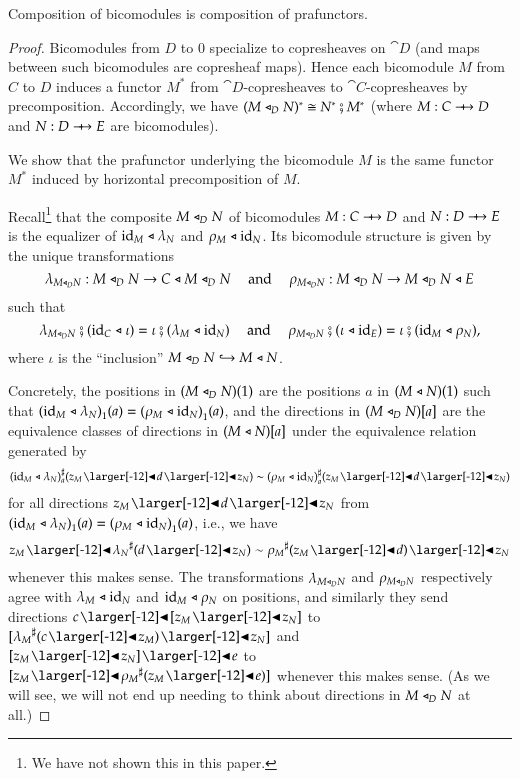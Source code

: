 \documentclass{amsart}
\begin{document}
\begin{prop}
  Composition of bicomodules is composition of prafunctors.
\end{prop}
\begin{proof}
  Bicomodules from $D$ to $0$ specialize to copresheaves on $\cat{D}$
  (and maps between such bicomodules are copresheaf maps). Hence each
  bicomodule $M$ from $C$ to $D$ induces a functor $M^*$ from
  $\cat{D}$-copresheaves to $\cat{C}$-copresheaves by
  precomposition. Accordingly, we have
  $(M \mathrel{\triangleleft}_D N)^* \cong N^* \fatsemi M^*$ (where $M: C \bim D$ and
  $N: D \bim E$ are bicomodules).
  
  We show that the prafunctor underlying the bicomodule $M$ is the
  same functor $M^*$ induced by horizontal precomposition of $M$.

  Recall\footnote{We have not shown this in this paper.} that the
  composite $M \mathrel{\triangleleft}_D N$ of bicomodules ${M: C \bim D}$ and
  ${N: D \bim E}$ is the equalizer of $\mathrm{id}_M \mathrel{\triangleleft} \lambda_N$ and
  $\rho_M \mathrel{\triangleleft} \mathrm{id}_N$. Its bicomodule structure is given by the
  unique transformations
  \[\lambda_{M \mathrel{\triangleleft}_D N}: M \mathrel{\triangleleft}_D N \to C \mathrel{\triangleleft} M \mathrel{\triangleleft}_D N \quad
    \text{ and } \quad \rho_{M \mathrel{\triangleleft}_D N} : M \mathrel{\triangleleft}_D N \to M \mathrel{\triangleleft}_D N
    \mathrel{\triangleleft} E\] such that
  \[\lambda_{M \mathrel{\triangleleft}_D N} \fatsemi (\mathrm{id}_C \mathrel{\triangleleft} \iota) = \iota \fatsemi
  (\lambda_M \mathrel{\triangleleft} \mathrm{id}_N) \quad \text{ and } \quad
  \rho_{M \mathrel{\triangleleft}_D N} \fatsemi (\iota \mathrel{\triangleleft} \mathrm{id}_E) = \iota \fatsemi
  (\mathrm{id}_M \mathrel{\triangleleft} \rho_N),\] where $\iota$ is the ``inclusion''
  $M \mathrel{\triangleleft}_D N \hookrightarrow M \mathrel{\triangleleft} N$.

  Concretely, the positions in $(M \mathrel{\triangleleft}_D N)(1)$ are the positions
  $a$ in $(M \mathrel{\triangleleft} N)(1)$ such that
  ${(\mathrm{id}_M \mathrel{\triangleleft} \lambda_N)}_1(a) = {(\rho_M \mathrel{\triangleleft}
    \mathrm{id}_N)}_1(a)$, and the directions in $(M \mathrel{\triangleleft}_D N)[a]$ are the
  equivalence classes of directions in $(M \mathrel{\triangleleft} N)[a]$ under the
  equivalence relation generated by
  \[\dirmapof{(\id_M \sub \lambda_N)}{a}{z_M \subd d \subd z_N} \sim \dirmapof{(\rho_M \sub
      \id_N)}{a}{z_M \subd d \subd z_N}\] for all directions
  $z_M \subd d \subd z_N$ from
  ${(\mathrm{id}_M \mathrel{\triangleleft} \lambda_N)}_1(a) = {(\rho_M \mathrel{\triangleleft}
    \mathrm{id}_N)}_1(a)$, i.e., we have
  \[z_M \subd \anydirmapof{\lambda_N}{d \subd z_N} \sim
    \anydirmapof{\rho_M}{z_M \subd d} \subd z_N\] whenever this makes
  sense. The transformations $\lambda_{M \mathrel{\triangleleft}_D N}$ and
  $\rho_{M \mathrel{\triangleleft}_D N}$ respectively agree with $\lambda_M \mathrel{\triangleleft} \mathrm{id}_N$
  and $\mathrm{id}_M \mathrel{\triangleleft} \rho_N$ on positions, and similarly they send
  directions $c \subd [z_M \subd z_N]$ to
  $[\anydirmapof{\lambda_M}{c \subd z_M} \subd z_N]$ and
  $[z_M \subd z_N] \subd e$ to
  $[z_M \subd \anydirmapof{\rho_M}{z_M \subd e}]$ whenever this makes
  sense. (As we will see, we will not end up needing to think about
  directions in $M \mathrel{\triangleleft}_D N$ at all.)


\end{proof}
\end{document}
